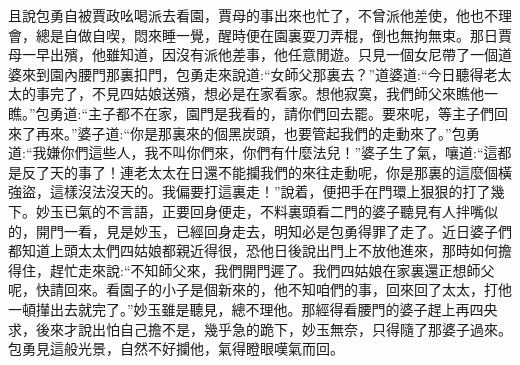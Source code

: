 \begin{parag}
    且說包勇自被賈政吆喝派去看園，賈母的事出來也忙了，不曾派他差使，他也不理會，總是自做自喫，悶來睡一覺，醒時便在園裏耍刀弄棍，倒也無拘無束。那日賈母一早出殯，他雖知道，因沒有派他差事，他任意閒遊。只見一個女尼帶了一個道婆來到園內腰門那裏扣門，包勇走來說道:“女師父那裏去？”道婆道:“今日聽得老太太的事完了，不見四姑娘送殯，想必是在家看家。想他寂寞，我們師父來瞧他一瞧。”包勇道:“主子都不在家，園門是我看的，請你們回去罷。要來呢，等主子們回來了再來。”婆子道:“你是那裏來的個黑炭頭，也要管起我們的走動來了。”包勇道:“我嫌你們這些人，我不叫你們來，你們有什麼法兒！”婆子生了氣，嚷道:“這都是反了天的事了！連老太太在日還不能攔我們的來往走動呢，你是那裏的這麼個橫強盜，這樣沒法沒天的。我偏要打這裏走！”說着，便把手在門環上狠狠的打了幾下。妙玉已氣的不言語，正要回身便走，不料裏頭看二門的婆子聽見有人拌嘴似的，開門一看，見是妙玉，已經回身走去，明知必是包勇得罪了走了。近日婆子們都知道上頭太太們四姑娘都親近得很，恐他日後說出門上不放他進來，那時如何擔得住，趕忙走來說:“不知師父來，我們開門遲了。我們四姑娘在家裏還正想師父呢，快請回來。看園子的小子是個新來的，他不知咱們的事，回來回了太太，打他一頓攆出去就完了。”妙玉雖是聽見，總不理他。那經得看腰門的婆子趕上再四央求，後來才說出怕自己擔不是，幾乎急的跪下，妙玉無奈，只得隨了那婆子過來。包勇見這般光景，自然不好攔他，氣得瞪眼嘆氣而回。
\end{parag}


